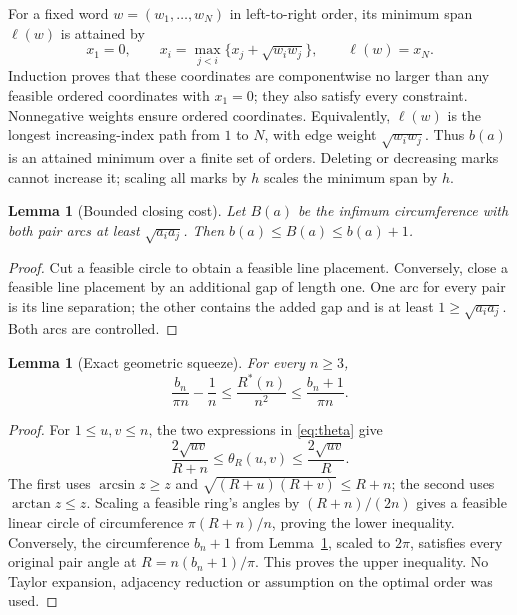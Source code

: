 \documentclass[11pt]{article}
\newtheorem{lemma}[theorem]{Lemma}
\theoremstyle{definition}\newtheorem{definition}[theorem]{Definition}
\theoremstyle{remark}\newtheorem{remark}[theorem]{Remark}
\newcommand{\Rstar}{R^\ast}
\DeclareMathOperator{\atan}{arctan}
\DeclareMathOperator{\asin}{arcsin}
\begin{document}
For a fixed word $w=(w_1,\ldots,w_N)$ in left-to-right order, its minimum
span $\ell(w)$ is attained by
\begin{equation}\label{eq:recurrence}
 x_1=0,\qquad x_i=\max_{j<i}\{x_j+\sqrt{w_iw_j}\},\qquad \ell(w)=x_N.
\end{equation}
Induction proves that these coordinates are componentwise no larger than
any feasible ordered coordinates with $x_1=0$; they also satisfy every
constraint. Nonnegative weights ensure ordered coordinates. Equivalently,
$\ell(w)$ is the longest increasing-index path from $1$ to $N$, with
edge weight $\sqrt{w_iw_j}$. Thus $b(a)$ is an attained minimum over a
finite set of orders. Deleting or decreasing marks cannot increase it;
scaling all marks by $h$ scales the minimum span by $h$.

\begin{lemma}[Bounded closing cost]\label{lem:closing}
Let $B(a)$ be the infimum circumference with both pair arcs at least
$\sqrt{a_i a_j}$. Then $b(a)\le B(a)\le b(a)+1$.
\end{lemma}
\begin{proof}
Cut a feasible circle to obtain a feasible line placement. Conversely,
close a feasible line placement by an additional gap of length one. One
arc for every pair is its line separation; the other contains the added
gap and is at least $1\ge\sqrt{a_i a_j}$. Both arcs are controlled.
\end{proof}

\begin{lemma}[Exact geometric squeeze]\label{lem:squeeze}
For every $n\ge3$,
\begin{equation}\label{eq:squeeze}
 \frac{b_n}{\pi n}-\frac1n
 \le\frac{\Rstar(n)}{n^2}\le\frac{b_n+1}{\pi n}.
\end{equation}
\end{lemma}
\begin{proof}
For $1\le u,v\le n$, the two expressions in \eqref{eq:theta} give
\[
 \frac{2\sqrt{uv}}{R+n}\le\theta_R(u,v)\le\frac{2\sqrt{uv}}R.
\]
The first uses $\asin z\ge z$ and
$\sqrt{(R+u)(R+v)}\le R+n$; the second uses $\atan z\le z$.
Scaling a feasible ring's angles by $(R+n)/(2n)$ gives a feasible linear
circle of circumference $\pi(R+n)/n$, proving the lower inequality.
Conversely, the circumference $b_n+1$ from Lemma~\ref{lem:closing},
scaled to $2\pi$, satisfies every original pair angle at
$R=n(b_n+1)/\pi$. This proves the upper inequality. No Taylor expansion,
adjacency reduction or assumption on the optimal order was used.
\end{proof}
\end{document}
